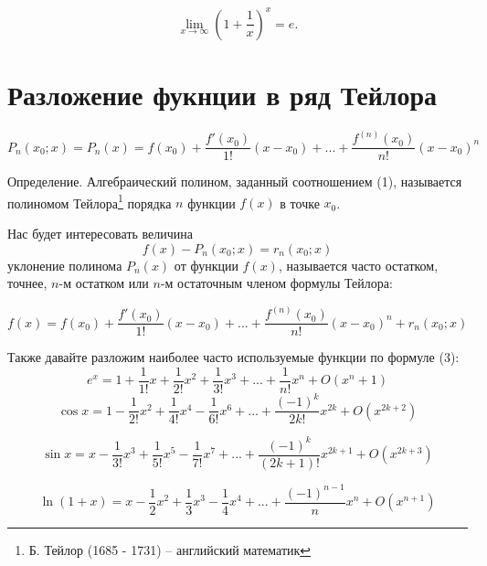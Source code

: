 \documentclass[a4paper, 12pt]{extarticle} %
\begin{document}
\begin{equation*}
    \lim _{{x\to \infty }}\left(1+{\frac  {1}{x}}\right)^{x}=e.
\end{equation*}

\clearpage


\section*{Разложение фукнции в ряд Тейлора}

\begin{equation}
    P_n(x_0; x) = P_n(x) = f(x_0) + \frac{f'(x_0)}{1!}(x - x_0) + ... + \frac{f^{(n)}(x_0)}{n!}(x - x_0)^n
\end{equation}

Определение. Алгебраический полином, заданный соотношением (1), называется полиномом Тейлора\footnote{Б. Тейлор (1685 - 1731) -- английский математик} порядка $n$ функции $f(x)$ в точке $x_0$.

Нас будет интересовать величина
\begin{equation}
    f(x) - P_n(x_0; x) = r_n(x_0; x)
\end{equation}
уклонение полинома $P_n(x)$ от функции $f(x)$, называется часто остатком, точнее, $n$-м остатком или $n$-м остаточным членом формулы Тейлора:

\begin{equation}
    f(x) = f(x_0) + \frac{f'(x_0)}{1!} (x - x_0) + ... + \frac{f^{(n)}(x_0)}{n!} (x - x_0)^n + r_n (x_0; x)
\end{equation}

Также давайте разложим наиболее часто используемые функции по формуле (3):
\begin{equation*}
    e^x = 1 + \frac{1}{1!}x + \frac{1}{2!}x^2 + \frac{1}{3!}x^3 + ... + \frac{1}{n!}x^n + O(x^n + 1)
\end{equation*}
\begin{equation*}
    \cos x = 1 - \frac{1}{2!}x^2 + \frac{1}{4!}x^4 - \frac{1}{6!}x^6 + ... + \frac{(-1)^k}{2k!}x^{2k} + O(x^{2k+2})
\end{equation*}

\begin{equation*}
    \sin x = x - \frac{1}{3!}x^3 + \frac{1}{5!}x^5 - \frac{1}{7!}x^7 + ... + \frac{(-1)^k}{(2k + 1)!}x^{2k + 1} + O(x^{2k+3})
\end{equation*}

\begin{equation*}
    \ln(1 + x) = x - \frac{1}{2}x^2 + \frac{1}{3}x^3 - \frac{1}{4}x^4 + ... + \frac{(-1)^{n - 1}}{n}x^n + O(x^{n + 1})
\end{equation*}
\end{document}
